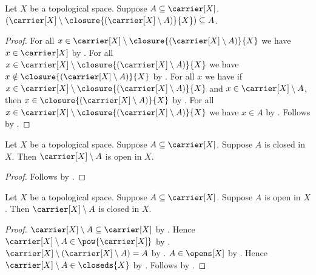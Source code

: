 \begin{proposition}\label{complement_of_closure_of_complement_of_x_subseteq_x}
    Let $X$ be a topological space.
    Suppose $A \subseteq \carrier[X]$.
    $(\carrier[X] \setminus \closure{(\carrier[X]\setminus A)}{X}) \subseteq A$.
\end{proposition}
\begin{proof}
    For all $x\in\carrier[X]\setminus\closure{(\carrier[X]\setminus A)}{X}$
    we have $x\in\carrier[X]$
        by .
    For all $x\in\carrier[X]\setminus\closure{(\carrier[X]\setminus A)}{X}$
    we have $x\notin\closure{(\carrier[X]\setminus A)}{X}$
        by .
    For all $x$ we have if
    $x\in\carrier[X]\setminus\closure{(\carrier[X]\setminus A)}{X}$ and
    $x\in\carrier[X]\setminus A$, then
    $x\in\closure{(\carrier[X]\setminus A)}{X}$
        by .
    For all $x\in\carrier[X]\setminus\closure{(\carrier[X]\setminus A)}{X}$
    we have $x\in A$ by .
    Follows by .
\end{proof}

\begin{proposition}\label{complement_of_closed_is_open}
    Let $X$ be a topological space.
    Suppose $A \subseteq \carrier[X]$.
    Suppose $A$ is closed in $X$.
    Then $\carrier[X] \setminus A$ is open in $X$.
\end{proposition}
\begin{proof}
    Follows by .
\end{proof}

\begin{proposition}\label{complement_of_open_is_closed}
    Let $X$ be a topological space.
    Suppose $A \subseteq \carrier[X]$.
    Suppose $A$ is open in $X$.
    Then $\carrier[X] \setminus A$ is closed in $X$.
\end{proposition}
\begin{proof}
    $\carrier[X]\setminus A\subseteq\carrier[X]$
        by .
    Hence $\carrier[X]\setminus A\in\pow{\carrier[X]}$
        by .
    $\carrier[X]\setminus(\carrier[X]\setminus A)=A$
        by .
    $A\in\opens[X]$ by .
    Hence $\carrier[X]\setminus A\in\closeds{X}$ by .
    Follows by .
\end{proof}

